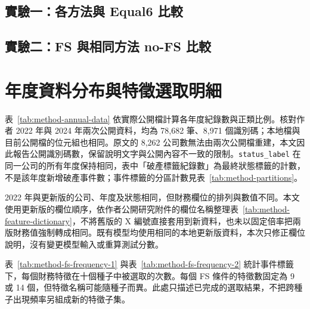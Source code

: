 \subsection*{實驗一：各方法與 Equal6 比較}


\subsection*{實驗二：FS 與相同方法 no-FS 比較}




\clearpage
\section{年度資料分布與特徵選取明細}\label{sec:appendix-data-fs}

表~\ref{tab:method-annual-data} 依實際公開檔計算各年度紀錄數與正類比例。核對作者 2022 年與 2024 年兩次公開資料，均為 78,682 筆、8,971 個識別碼；本地檔與目前公開檔的位元組也相同。原文的 8,262 公司數無法由兩次公開檔重建，本文因此報告公開識別碼數，保留說明文字與公開內容不一致的限制。\nolinkurl{status_label} 在同一公司的所有年度保持相同，表中「破產標籤紀錄數」為最終狀態標籤的計數，不是該年度新增破產事件數；事件標籤的分區計數見表~\ref{tab:method-partitions}。

2022 年與更新版的公司、年度及狀態相同，但財務欄位的排列與數值不同。本文使用更新版的欄位順序，依作者公開研究附件的欄位名稱整理表~\ref{tab:method-feature-dictionary}，不將舊版的 X 編號直接套用到新資料，也未以固定倍率把兩版財務值強制轉成相同。既有模型均使用相同的本地更新版資料，本次只修正欄位說明，沒有變更模型輸入或重算測試分數。



表~\ref{tab:method-fs-frequency-1} 與表~\ref{tab:method-fs-frequency-2} 統計事件標籤下，每個財務特徵在十個種子中被選取的次數。每個 FS 條件的特徵數固定為 9 或 14 個，但特徵名稱可能隨種子而異。此處只描述已完成的選取結果，不把跨種子出現頻率另組成新的特徵子集。



\endgroup
